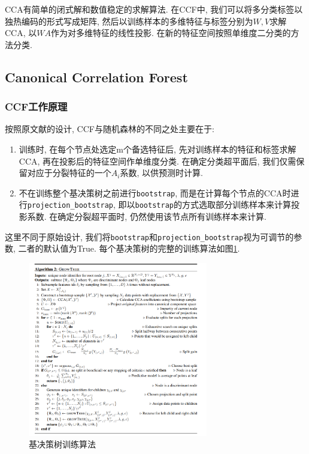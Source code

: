 \documentclass[a4paper]{article}
\begin{document}
CCA有简单的闭式解和数值稳定的求解算法. 在CCF中, 我们可以将多分类标签以独热编码的形式写成矩阵, 然后以训练样本的多维特征与标签分别为$W,V$求解CCA, 以$WA$作为对多维特征的线性投影. 在新的特征空间按照单维度二分类的方法分类. 

\subsection{Canonical Correlation Forest}

\subsubsection{CCF工作原理}
按照原文献\cite{ccf}的设计, CCF与随机森林的不同之处主要在于:
\begin{enumerate}
    \item 训练时, 在每个节点处选定m个备选特征后, 先对训练样本的特征和标签求解CCA, 再在投影后的特征空间作单维度分类. 在确定分类超平面后, 我们仅需保留对应于分裂特征的一个$A_i$系数, 以供预测时计算.
    \item 不在训练整个基决策树之前进行\texttt{bootstrap}, 而是在计算每个节点的CCA时进行\texttt{projection\_bootstrap}, 即以\texttt{bootstrap}的方式选取部分训练样本来计算投影系数. 在确定分裂超平面时, 仍然使用该节点所有训练样本来计算.
\end{enumerate}
这里不同于原始设计, 我们将\texttt{bootstrap}和\texttt{projection\_bootstrap}视为可调节的参数, 二者的默认值为True.  每个基决策树的完整的训练算法\cite{ccf}如图\ref{fig:train_ccf}.
\begin{figure}[h]
    \centering
    \includegraphics[width=0.7\textwidth,height=0.7\textwidth]{figs/6.png}
    
    \caption{基决策树训练算法}
    \label{fig:train_ccf}
\end{figure}
\end{document}
